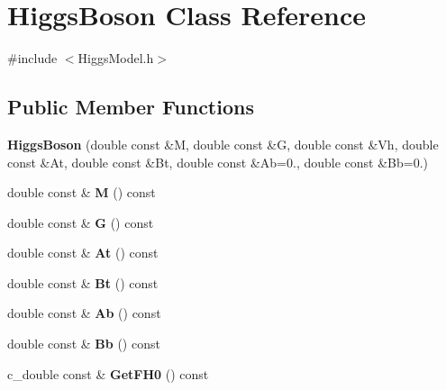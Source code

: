 \hypertarget{classHiggsBoson}{\section{Higgs\-Boson Class Reference}
\label{classHiggsBoson}
}


{\ttfamily \#include $<$Higgs\-Model.\-h$>$}

\subsection*{Public Member Functions}
\begin{DoxyCompactItemize}
\item 
\hypertarget{classHiggsBoson_aef7e66e7df2850281117c8065f86266a}{{\bfseries Higgs\-Boson} (double const \&M, double const \&G, double const \&Vh, double const \&At, double const \&Bt, double const \&Ab=0., double const \&Bb=0.)}\label{classHiggsBoson_aef7e66e7df2850281117c8065f86266a}

\item 
\hypertarget{classHiggsBoson_a3a18ef5458760d0b4fe6f7f67847f200}{double const \& {\bfseries M} () const }\label{classHiggsBoson_a3a18ef5458760d0b4fe6f7f67847f200}

\item 
\hypertarget{classHiggsBoson_abee4eef942de0a4088166fa59b09054e}{double const \& {\bfseries G} () const }\label{classHiggsBoson_abee4eef942de0a4088166fa59b09054e}

\item 
\hypertarget{classHiggsBoson_a56fe580ffe65572242ba5170c5f95126}{double const \& {\bfseries At} () const }\label{classHiggsBoson_a56fe580ffe65572242ba5170c5f95126}

\item 
\hypertarget{classHiggsBoson_a0919c5fc894bb010490229271e781bdd}{double const \& {\bfseries Bt} () const }\label{classHiggsBoson_a0919c5fc894bb010490229271e781bdd}

\item 
\hypertarget{classHiggsBoson_a15a4d40ec981360f0c1033d5c7156c99}{double const \& {\bfseries Ab} () const }\label{classHiggsBoson_a15a4d40ec981360f0c1033d5c7156c99}

\item 
\hypertarget{classHiggsBoson_ad4dc9de0ef7ca8a9c2edb8884e41bd88}{double const \& {\bfseries Bb} () const }\label{classHiggsBoson_ad4dc9de0ef7ca8a9c2edb8884e41bd88}

\item 
\hypertarget{classHiggsBoson_a89f471e351c72fcf5e95846b34727383}{c\-\_\-double const \& {\bfseries Get\-F\-H0} () const }\label{classHiggsBoson_a89f471e351c72fcf5e95846b34727383}


\end{DoxyCompactItemize}

